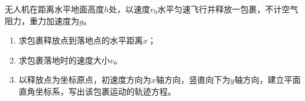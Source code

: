 无人机在距离水平地面高度\(h\)处，以速度\(v_0\)水平匀速飞行并释放一包裹，不计空气阻力，重力加速度为\(g\)。
\begin{enumerate}
	\item 求包裹释放点到落地点的水平距离\(x\)；
	\item 求包裹落地时的速度大小\(v\)。
	\item 以释放点为坐标原点，初速度方向为\(x\)轴方向，竖直向下为\(y\)轴方向，建立平面直角坐标系，写出该包裹运动的轨迹方程。
\end{enumerate}
\begin{answer}
    
\end{answer}